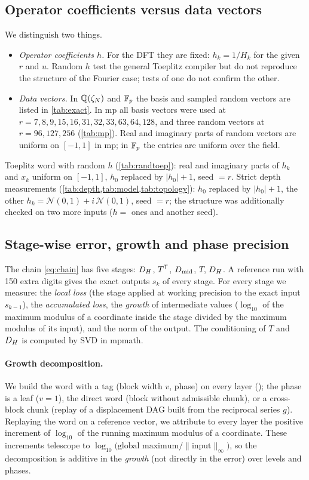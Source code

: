 \documentclass[11pt]{article}
\theoremstyle{plain}
\newcommand{\abs}[1]{\lvert #1\rvert}
\newcommand{\norm}[1]{\lVert #1\rVert}
\begin{document}
\subsection{Operator coefficients versus data vectors}\label{sec:inputs}
We distinguish two things.
\begin{itemize}
\item \emph{Operator coefficients $h$.} For the DFT they are fixed: $h_k=1/H_k$ for the given $r$ and $u$. Random $h$ test the general Toeplitz compiler but do not reproduce the structure of the Fourier case; tests of one do not confirm the other.
\item \emph{Data vectors.} In $\mathbb{Q}(\zeta_N)$ and $\mathbb{F}_p$ the basis and sampled random vectors are listed in \cref{tab:exact}. In mp all basis vectors were used at $r=7,8,9,15,16,31,32,33,63,64,128$, and three random vectors at $r=96,127,256$ (\cref{tab:mp}). Real and imaginary parts of random vectors are uniform on $[-1,1]$ in mp; in $\mathbb{F}_p$ the entries are uniform over the field.
\end{itemize}
Toeplitz word with random $h$ (\cref{tab:randtoep}): real and imaginary parts of $h_k$ and $x_k$ uniform on $[-1,1]$, $h_0$ replaced by $\abs{h_0}+1$, seed $=r$. Strict depth measurements (\cref{tab:depth,tab:model,tab:topology}): $h_0$ replaced by $\abs{h_0}+1$, the other $h_k=\mathcal N(0,1)+i\,\mathcal N(0,1)$, seed $=r$; the structure was additionally checked on two more inputs ($h=$ ones and another seed).

\subsection{Stage-wise error, growth and phase precision}\label{sec:stagewise}
The chain \eqref{eq:chain} has five stages: $D_H$, $T^{\mathsf{T}}$, $D_{\mathrm{mid}}$, $T$, $D_H$. A reference run with 150 extra digits gives the exact outputs $s_k$ of every stage. For every stage we measure: the \emph{local loss} (the stage applied at working precision to the exact input $s_{k-1}$), the \emph{accumulated loss}, the \emph{growth} of intermediate values ($\log_{10}$ of the maximum modulus of a coordinate inside the stage divided by the maximum modulus of its input), and the norm of the output. The conditioning of $T$ and $D_H$ is computed by SVD in mpmath.

\paragraph{Growth decomposition.}
We build the word with a tag (block width $v$, phase) on every layer (); the phase is a leaf ($v=1$), the direct word (block without admissible chunk), or a cross-block chunk (replay of a displacement DAG built from the reciprocal series $g$). Replaying the word on a reference vector, we attribute to every layer the positive increment of $\log_{10}$ of the running maximum modulus of a coordinate. These increments telescope to $\log_{10}\bigl(\text{global maximum}/\norm{\text{input}}_\infty\bigr)$, so the decomposition is additive in the \emph{growth} (not directly in the error) over levels and phases.
\end{document}
